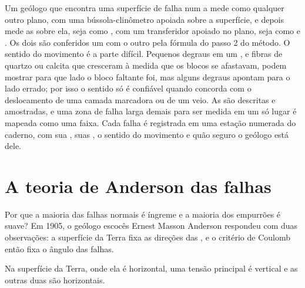 \begin{inthefield}
Um geólogo que encontra uma superfície de falha num  a mede como qualquer outro plano, com uma bússola-clinômetro apoiada sobre a superfície, e depois mede as  sobre ela, seja como , com um transferidor apoiado no plano, seja como  e . Os dois são conferidos um com o outro pela fórmula do passo 2 do método. O sentido do movimento é a parte difícil. Pequenos degraus em um , e fibras de quartzo ou calcita que cresceram à medida que os blocos se afastavam, podem mostrar para que lado o bloco faltante foi, mas alguns degraus apontam para o lado errado; por isso o sentido só é confiável quando concorda com o deslocamento de uma camada marcadora ou de um veio. As  são descritas e amostradas, e uma zona de falha larga demais para ser medida em um só lugar é mapeada como uma faixa. Cada falha é registrada em uma estação numerada do caderno, com sua , suas , o sentido do movimento e quão seguro o geólogo está dele.
\end{inthefield}

\section{A teoria de Anderson das falhas}\label{sec:b1:faults-folds-fabrics:anderson}

Por que a maioria das falhas normais é íngreme e a maioria dos empurrões é suave? Em 1905, o geólogo escocês Ernest Masson Anderson respondeu com duas observações: a superfície da Terra fixa as direções das , e o critério de Coulomb então fixa o ângulo das falhas.

\begin{proposition}\label{prop:b1:faults-folds-fabrics:free-surface}
Na superfície da Terra, onde ela é horizontal, uma tensão principal é vertical e as outras duas são horizontais.
\end{proposition}

